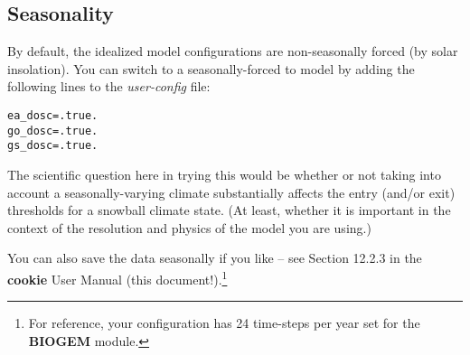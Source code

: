 
\subsection{Seasonality}

By default, the idealized model configurations are non-seasonally forced (by solar insolation). You can switch to a seasonally-forced to model by adding the following lines to the \textit{user-config} file:

\vspace{-3mm}
\small\begin{verbatim}
ea_dosc=.true.
go_dosc=.true.
gs_dosc=.true.
\end{verbatim}\normalsize
\vspace{-2mm}

The scientific question here in trying this would be whether or not taking into account a seasonally-varying climate substantially affects the entry (and/or exit) thresholds for a snowball climate state. (At least, whether it is important in the context of the resolution and physics of the model you are using.)

You can also save the data seasonally if you like – see Section 12.2.3 in the \textbf{cookie} User Manual (this document!).\footnote{For reference, your configuration has 24 time-steps per year set for the \textbf{BIOGEM} module.}

